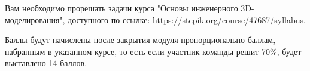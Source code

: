 
Вам необходимо прорешать задачи курса "Основы инженерного 3D-моделирования", доступного по ссылке: \url{https://stepik.org/course/47687/syllabus}.

\markSection

Баллы будут начислены после закрытия модуля пропорционально баллам, набранным в указанном курсе, то есть если участник команды решит 70\%, будет выставлено 14 баллов. 

